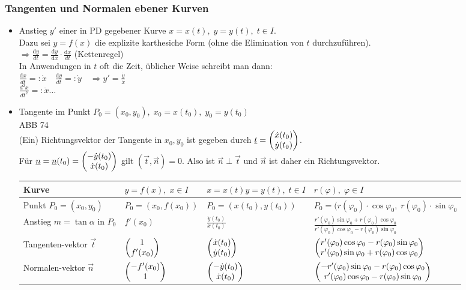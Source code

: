 \subsubsection{Tangenten und Normalen ebener Kurven}
\begin{itemize}
\item Anstieg $y'$ einer in PD gegebener Kurve $x=x(t), \; y=y(t), \; t\in I$.\\
Dazu sei $y=f(x)$ die explizite karthesiche Form (ohne die Elimination von $t$ durchzuführen).\\
$\Rightarrow \frac{\mathrm{d}y}{dt}=\frac{\mathrm{d}y}{\mathrm{d}x}\cdot \frac{\mathrm{d}x}{dt}$ (Kettenregel)\\
In Anwendungen in $t$ oft die Zeit, üblicher Weise schreibt man dann:\\
$\frac{\mathrm{d}x}{dt}=:\dot{x} \quad \frac{\mathrm{d}y}{dt}=:\dot{y} \quad \Rightarrow y'=\frac{\dot{y}}{\dot{x}}$\\
$\frac{d^2x}{dt^2}=:\ddot{x} \dots $
\item Tangente im Punkt $P_0=(x_0,y_0), \; x_0 = x(t_0), \; y_0=y(t_0)$\\
ABB 74\\
(Ein) Richtungsvektor der Tangente in $x_0, y_0$ ist gegeben durch $\underline{t}=\begin{pmatrix}\dot{x}(t_0)\\ \dot{y}(t_0)\end{pmatrix}$.\\
Für $\underline{n}=\underline{n}(t_0)=\begin{pmatrix}-\dot{y}(t_0)\\ \dot{x}(t_0)\end{pmatrix}$ gilt $(\vec{t}, \vec{n})=0$. Also ist $\vec{n}\perp \vec{t}$ und $\vec{n}$ ist daher ein Richtungsvektor.\\
\begin{tabular}{L{.18} | l | L{.18} | l}
Kurve & $y=f(x),\;x\in I$ & $x=x(t)$\newline $y=y(t), \; t\in I$ & $r(\varphi), \; \varphi \in I$ \\
\hline 
Punkt \newline$P_0=(x_0,y_0)$ & $P_0=(x_0,f(x_0))$ & $P_0=(x(t_0),y(t_0))$& $P_0=(r(\varphi_0)\cdot \cos\varphi_0 , \; r(\varphi_0) \cdot \sin \varphi_0$\\
Anstieg $m=\tan\alpha$ in $P_0$ & $f'(x_0)$ & $\frac{\dot{y}(t_0)}{\dot{x}(t_0)}$ & $\frac{r'(\varphi_0)\sin\varphi_0 + r(\varphi_0)\cos \varphi_0}{r'(\varphi_0)\cos\varphi_0 - r(\varphi_0)\sin \varphi_0}$\\
Tangenten-\newline vektor $\vec{t}$ & $\begin{pmatrix}1\\ f'(x_0)\end{pmatrix}$ & $\begin{pmatrix}\dot{x}(t_0) \\ \dot{y}(t_0)\end{pmatrix}$ & $\begin{pmatrix}r'(\varphi_0)\cos\varphi_0 - r(\varphi_0)\sin \varphi_0\\r'(\varphi_0)\sin\varphi_0 + r(\varphi_0)\cos \varphi_0\end{pmatrix}$\\
Normalen-\newline vektor $\vec{n}$ & $\begin{pmatrix}-f'(x_0) \\ 1\end{pmatrix}$ & $\begin{pmatrix}-\dot{y}(t_0)\\\dot{x}(t_0)\end{pmatrix}$ & $\begin{pmatrix}-r'(\varphi_0)\sin\varphi_0 - r(\varphi_0)\cos \varphi_0\\ r'(\varphi_0)\cos\varphi_0 - r(\varphi_0)\sin \varphi_0\end{pmatrix}$ \\
\end{tabular}
\end{itemize}
